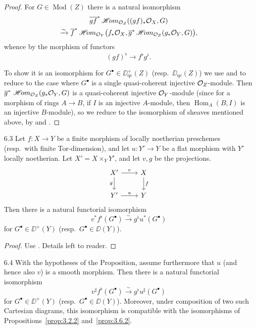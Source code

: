 \begin{proof}
For $G\in\operatorname{Mod}(Z)$ there is a natural isomorphism
\begin{multline*}
\overline{gf}^{*}\mathop{\mathscr{H}\!om}\nolimits_{\mathcal{O}_Z}((gf)_*\mathcal{O}_X,G) \\
\xrightarrow{\sim} \overline{f}^{*}\mathop{\mathscr{H}\!om}\nolimits_{\mathcal{O}_Y}\bigl(f_*\mathcal{O}_X,
\overline{g}^{*}\mathop{\mathscr{H}\!om}\nolimits_{\mathcal{O}_Z}(g_*\mathcal{O}_Y,G)\bigr),
\end{multline*}
whence by  the morphism of functors
\[
(gf)^{\flat} \longrightarrow f^{\flat}g^{\flat}.
\]

To show it is an isomorphism for $G^\bullet\in\DD_{\mathrm{qc}}^+(Z)$ (resp.\ $\DD_{\mathrm{qc}}(Z)$) we use  and  to reduce to the case where $G^\bullet$ is a single quasi-coherent injective $\mathcal{O}_Z$-module. Then $\overline{g}^*\,\mathop{\mathscr{H}\!om}\nolimits_{\mathcal{O}_Z}(g_*\mathcal{O}_Y,G)$ is a quasi-coherent injective $\mathcal{O}_Y$-module (since for a morphism of rings $A\to B$, if $I$ is an injective $A$-module, then $\operatorname{Hom}_A(B,I)$ is an injective $B$-module), so we reduce to the isomorphism of sheaves mentioned above, by  and .
\end{proof}

\begin{bookproposition}{6.3}\label{prop:3.6.3}
Let $f\colon X\to Y$ be a finite morphism of locally noetherian preschemes (resp.\ with finite Tor-dimension), and let $u\colon Y'\to Y$ be a flat morphism with $Y'$ locally noetherian. Let $X'=X\times_Y Y'$, and let $v,g$ be the projections.
\[
\begin{tikzcd}
	X' \arrow[r, "v"] \arrow[d, "g"'] & X \arrow[d, "f"] \\
	Y' \arrow[r, "u"] & Y
\end{tikzcd}
\]
Then there is a natural functorial isomorphism
\[
v^*f^{\flat}(G^\bullet) \xrightarrow{\sim} g^{\flat}u^*(G^\bullet)
\]
for $G^\bullet\in\DD^+(Y)$ (resp.\ $G^\bullet\in\DD(Y)$).
\end{bookproposition}

\begin{proof}
Use . Details left to reader.
\end{proof}

\begin{bookcorollary}{6.4}\label{cor:3.6.4}
With the hypotheses of the Proposition, assume furthermore that $u$ (and hence also $v$) is a smooth morphism. Then there is a natural functorial isomorphism
\[
v^{\sharp}f^{\flat}(G^\bullet) \xrightarrow{\sim} g^{\flat}u^{\sharp}(G^\bullet)
\]
for $G^\bullet\in\DD^+(Y)$ (resp.\ $G^\bullet\in\DD(Y)$). Moreover, under composition of two such Cartesian diagrams, this isomorphism is compatible with the isomorphisms of Propositions~\ref{prop:3.2.2} and~\ref{prop:3.6.2}.
\end{bookcorollary}

